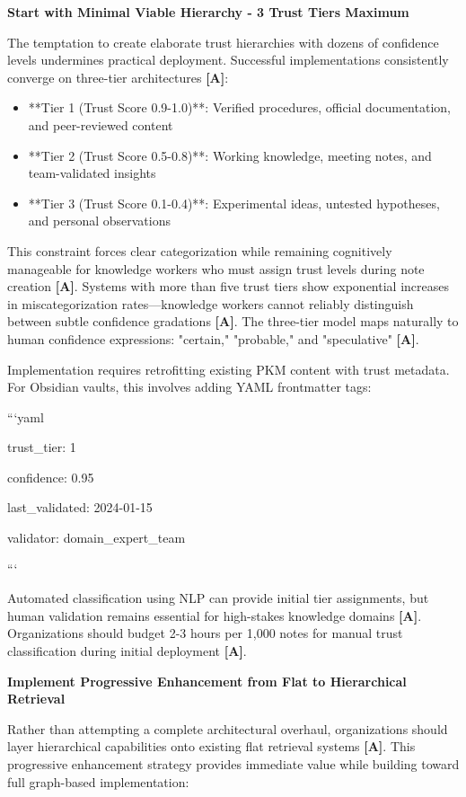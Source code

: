 \documentclass[a4paper,11pt]{article}
\newcommand{\alabel}{\textbf{\textcolor{acolor}{[A]}}}
\begin{document}
\textbf{Start with Minimal Viable Hierarchy - 3 Trust Tiers Maximum}\par

The temptation to create elaborate trust hierarchies with dozens of confidence levels undermines practical deployment. Successful implementations consistently converge on three-tier architectures \alabel{}:


\begin{itemize}
  \item **Tier 1 (Trust Score 0.9-1.0)**: Verified procedures, official documentation, and peer-reviewed content
  \item **Tier 2 (Trust Score 0.5-0.8)**: Working knowledge, meeting notes, and team-validated insights
  \item **Tier 3 (Trust Score 0.1-0.4)**: Experimental ideas, untested hypotheses, and personal observations
\end{itemize}

This constraint forces clear categorization while remaining cognitively manageable for knowledge workers who must assign trust levels during note creation \alabel{}. Systems with more than five trust tiers show exponential increases in miscategorization rates—knowledge workers cannot reliably distinguish between subtle confidence gradations \alabel{}. The three-tier model maps naturally to human confidence expressions: "certain," "probable," and "speculative" \alabel{}.


Implementation requires retrofitting existing PKM content with trust metadata. For Obsidian vaults, this involves adding YAML frontmatter tags:


```yaml

trust\_tier: 1

confidence: 0.95

last\_validated: 2024-01-15

validator: domain\_expert\_team

```


Automated classification using NLP can provide initial tier assignments, but human validation remains essential for high-stakes knowledge domains \alabel{}. Organizations should budget 2-3 hours per 1,000 notes for manual trust classification during initial deployment \alabel{}.


\textbf{Implement Progressive Enhancement from Flat to Hierarchical Retrieval}\par

Rather than attempting a complete architectural overhaul, organizations should layer hierarchical capabilities onto existing flat retrieval systems \alabel{}. This progressive enhancement strategy provides immediate value while building toward full graph-based implementation:
\end{document}
